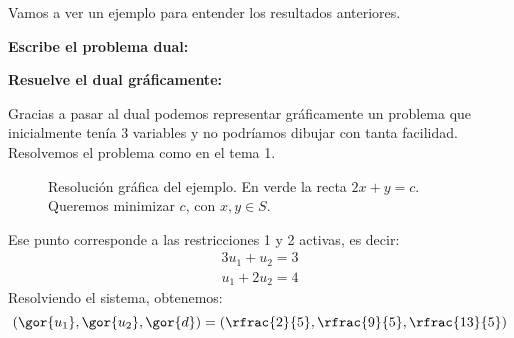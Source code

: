 \begin{example}

Vamos a ver un ejemplo para entender los resultados anteriores.


\begin{ioprob}
\end{ioprob}

\textbf{Escribe el problema dual:}

\begin{ioprob}
\end{ioprob}


\textbf{Resuelve el dual gráficamente:}

Gracias a pasar al dual podemos representar gráficamente un problema que inicialmente tenía 3 variables y no podríamos dibujar con tanta facilidad.
%
Resolvemos el problema como en el tema 1.



\begin{figure}[hbtp]
\centering
{}
\caption{Resolución gráfica del ejemplo. En verde la recta $2x+y=c$. Queremos minimizar $c$, con $x,y\in S$.}
\end{figure}

Ese punto corresponde a las restricciones 1 y 2 activas, es decir:
%
\[
	\begin{array}{c}
		3u_1+u_2 = 3\\
		u_1+2u_2 = 4
	\end{array}

\]
%
Resolviendo el sistema, obtenemos: 
%
\[
	\left(\gor{u_1},\gor{u_2},\gor{d}\right) = \left(\rfrac{2}{5},\rfrac{9}{5},\rfrac{13}{5}\right)
\]




\end{example}
